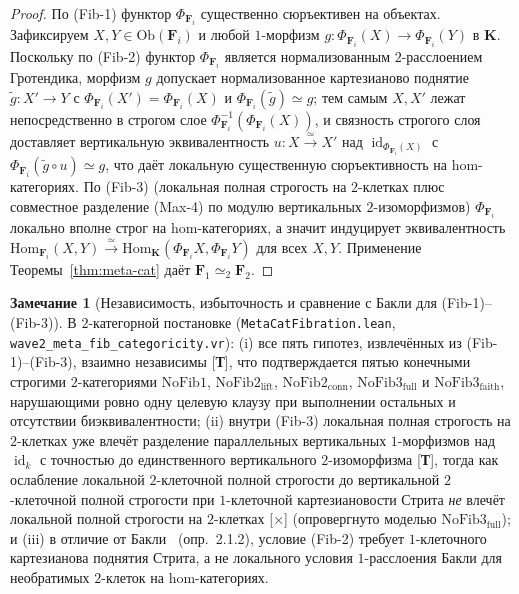 \documentclass[11pt]{article}
\theoremstyle{plain}
\theoremstyle{definition}
\newtheorem{remark}[theorem]{Замечание}
\newcommand{\Ob}{\mathrm{Ob}}
\newcommand{\Hom}{\mathrm{Hom}}
\DeclareMathOperator{\id}{id}
\begin{document}
\begin{proof}
По \textup{(Fib-1)} функтор $\Phi_{\mathbf{F}_i}$ существенно сюръективен на объектах. Зафиксируем $X, Y \in \Ob(\mathbf{F}_i)$ и любой $1$-морфизм $g : \Phi_{\mathbf{F}_i}(X) \to \Phi_{\mathbf{F}_i}(Y)$ в $\mathbf{K}$. Поскольку по \textup{(Fib-2)} функтор $\Phi_{\mathbf{F}_i}$ является нормализованным $2$-расслоением Гротендика, морфизм $g$ допускает нормализованное картезианово поднятие $\tilde{g} : X' \to Y$ с $\Phi_{\mathbf{F}_i}(X') = \Phi_{\mathbf{F}_i}(X)$ и $\Phi_{\mathbf{F}_i}(\tilde{g}) \simeq g$; тем самым $X, X'$ лежат непосредственно в строгом слое $\Phi_{\mathbf{F}_i}^{-1}(\Phi_{\mathbf{F}_i}(X))$, и связность строгого слоя доставляет вертикальную эквивалентность $u : X \xrightarrow{\simeq} X'$ над $\id_{\Phi_{\mathbf{F}_i}(X)}$ с $\Phi_{\mathbf{F}_i}(\tilde{g} \circ u) \simeq g$, что даёт локальную существенную сюръективность на hom-категориях. По \textup{(Fib-3)} (локальная полная строгость на $2$-клетках плюс совместное разделение \textup{(Max-4)} по модулю вертикальных $2$-изоморфизмов) $\Phi_{\mathbf{F}_i}$ локально вполне строг на hom-категориях, а значит индуцирует эквивалентность $\Hom_{\mathbf{F}_i}(X, Y) \xrightarrow{\simeq} \Hom_{\mathbf{K}}(\Phi_{\mathbf{F}_i} X, \Phi_{\mathbf{F}_i} Y)$ для всех $X, Y$. Применение Теоремы~\ref{thm:meta-cat} даёт $\mathbf{F}_1 \simeq_2 \mathbf{F}_2$.
\end{proof}

\begin{remark}[Независимость, избыточность и сравнение с Бакли для \textup{(Fib-1)--(Fib-3)}]\label{rem:fib-independence}
В $2$-категорной постановке (\texttt{MetaCatFibration.lean}, \texttt{wave2\_meta\_fib\_categoricity.vr}): (i) все пять гипотез, извлечённых из \textup{(Fib-1)--(Fib-3)}, взаимно независимы \textup{[\textbf{Т}]}, что подтверждается пятью конечными строгими $2$-категориями $\mathrm{NoFib1}$, $\mathrm{NoFib2}_{\mathrm{lift}}$, $\mathrm{NoFib2}_{\mathrm{conn}}$, $\mathrm{NoFib3}_{\mathrm{full}}$ и $\mathrm{NoFib3}_{\mathrm{faith}}$, нарушающими ровно одну целевую клаузу при выполнении остальных и отсутствии биэквивалентности; (ii) внутри \textup{(Fib-3)} локальная полная строгость на $2$-клетках уже влечёт разделение параллельных вертикальных $1$-морфизмов над $\id_k$ с точностью до единственного вертикального $2$-изоморфизма \textup{[\textbf{Т}]}, тогда как ослабление локальной $2$-клеточной полной строгости до вертикальной $2$-клеточной полной строгости при $1$-клеточной картезиановости Стрита \emph{не} влечёт локальной полной строгости на $2$-клетках \textup{[\textbf{$\times$}]} (опровергнуто моделью $\mathrm{NoFib3}_{\mathrm{full}}$); и (iii) в отличие от Бакли~\cite{Buckley2014} (опр.~2.1.2), условие \textup{(Fib-2)} требует $1$-клеточного картезианова поднятия Стрита, а не локального условия $1$-расслоения Бакли для необратимых $2$-клеток на hom-категориях.
\end{remark}
\end{document}
